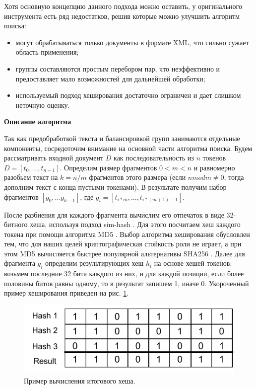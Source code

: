 \documentclass[14pt]{matmex-diploma-custom}
\begin{document}
Хотя основную концепцию данного подхода можно оставить, у оригинального инструмента есть ряд недостатков, решив которые можно улучшить алгоритм поиска:
\begin{itemize}
	\item могут обрабатываться только документы в формате XML, что сильно сужает область применения;
	\item группы составляются простым перебором пар, что неэффективно и предоставляет мало возможностей для дальнейшей обработки;
	\item используемый подход хеширования достаточно ограничен и дает слишком неточную оценку.
\end{itemize}

\textbf{Описание алгоритма}

Так как предобработкой текста и балансировкой групп занимаются отдельные компоненты, сосредоточим внимание на основной части алгоритма поиска. Будем рассматривать входной документ $D$ как последовательность из $n$ токенов $D = [t_0,...,t_{n-1}]$. Определим размер фрагментов $0 < m < n$ и равномерно разобьем текст на $k = n / m$ фрагментов этого размера (если $n mod m \ne 0$, тогда дополним текст с конца пустыми токенами). В результате получим набор фрагментов $[g_0,...g_{k-1}]$, где $g_i = [t_{i * m},...,t_{i * (m + 1) - 1}]$. 

После разбиения для каждого фрагмента вычислим его отпечаток в виде 32-битного хеша, используя подход sim-hash \cite{bib:art:SimHash}. Для этого посчитаем хеш каждого токена при помощи алгоритма MD5 \cite{bib:art:MD5}. Выбор алгоритма хеширования обусловлен тем, что для наших целей криптографическая стойкость роли не играет, а при этом MD5 вычисляется быстрее популярной альтернативы SHA256 \cite{bib:art:MD5vsSHA256}. Далее для фрагмента $g_i$ определим результирующих хеш $h_i$ на основе хешей токенов: возьмем последние 32 бита каждого из них, и для каждой позиции, если более половины битов равны одному, то в результат запишем 1, иначе 0. Укороченный пример хеширования приведен на рис. \ref{fig:Hashing}.

\begin{figure}[h!]
	\includegraphics[scale=1.5]{pictures/Hash.pdf}
	\centering
	\caption{Пример вычисления итогового хеша.}
	\label{fig:Hashing}
\end{figure}
\end{document}
